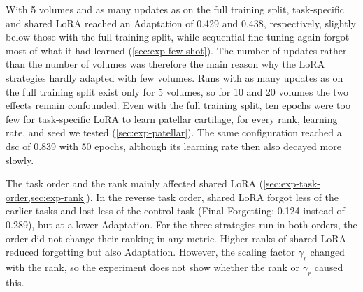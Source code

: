 With 5 volumes and as many updates as on the full training split, task-specific and shared LoRA reached an Adaptation of 0.429 and 0.438, respectively, slightly below those with the full training split, while sequential fine-tuning again forgot most of what it had learned (\cref{sec:exp-few-shot}).
The number of updates rather than the number of volumes was therefore the main reason why the LoRA strategies hardly adapted with few volumes.
Runs with as many updates as on the full training split exist only for 5 volumes, so for 10 and 20 volumes the two effects remain confounded.
Even with the full training split, ten epochs were too few for task-specific LoRA to learn patellar cartilage, for every rank, learning rate, and seed we tested (\cref{sec:exp-patellar}).
The same configuration reached a \gls{dsc} of 0.839 with 50 epochs, although its learning rate then also decayed more slowly.

The task order and the rank mainly affected shared LoRA (\cref{sec:exp-task-order,sec:exp-rank}).
In the reverse task order, shared LoRA forgot less of the earlier tasks and lost less of the control task (Final Forgetting: 0.124 instead of 0.289), but at a lower Adaptation.
For the three strategies run in both orders, the order did not change their ranking in any metric.
Higher ranks of shared LoRA reduced forgetting but also Adaptation.
However, the scaling factor $\gamma_r$ changed with the rank, so the experiment does not show whether the rank or $\gamma_r$ caused this.

